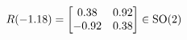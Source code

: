 \documentclass[preview]{standalone}
\begin{document}
\begin{align*}
\special{dvisvgm:raw <g id='unique000'>}R(-1.18) = \begin{bmatrix} 0.38 & 0.92 \\ -0.92 & 0.38 \end{bmatrix} \in \text{SO}(2)\special{dvisvgm:raw </g>}
\end{align*}
\end{document}
